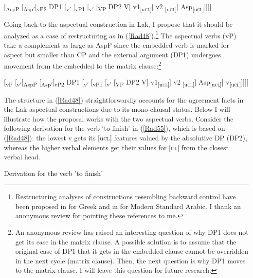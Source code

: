 \documentclass[output=paper]{langscibook}
\begin{document}
\ea\label{Rad54}

[\textsubscript{AspP} [\textsubscript{Asp$'$}[\textsubscript{vP2} DP1 [\textsubscript{v$'$} [\textsubscript{vP1} [\textsubscript{v$'$} [\textsubscript{VP} DP2 V]  v1\textsubscript{[u\textsc{cl}]}] v2 \textsubscript{[u\textsc{cl}]}] Asp\textsubscript{[u\textsc{cl}]}]]]]\\
\z

Going back to the aspectual construction in Lak, I propose that it should be analyzed as a case of restructuring as in (\ref{Rad48}).\footnote{Restructuring analyses of constructions resembling backward control have been proposed in \cite{Roussou2009} for Greek and in \cite{GreshlerWintner2017} for Modern Standard Arabic. I thank an anonymous review for pointing these references to me.} The aspectual verbs (vP) take a complement as large as AspP since the embedded verb is marked for aspect but smaller than CP and the external argument (DP1) undergoes movement from the embedded to the matrix clause:\footnote{An anonymous review has raised an interesting question of why DP1 does not get its case in the matrix clause. A possible solution is to assume that the original case of DP1 that it gets in the embedded clause cannot be overridden in the next cycle (matrix clause). Then, the next question is why DP1 moves to the matrix clause. I will leave this question for future research.}

\ea\label{Rad48}
[\textsubscript{vP} [\textsubscript{v$'$}[\textsubscript{AspP} [\textsubscript{Asp$'$}[\textsubscript{vP2} DP1 [\textsubscript{v$'$} [\textsubscript{vP1} [\textsubscript{v$'$} [\textsubscript{VP} DP2 V]  v1\textsubscript{[u\textsc{cl}]}] v2 \textsubscript{[u\textsc{cl}]}] Asp\textsubscript{[u\textsc{cl}]}] v\textsubscript{[u\textsc{cl}]}]]]]\\
\z 

The structure in (\ref{Rad48}) straightforwardly accounts for the agreement facts in the Lak aspectual constructions due to its mono-clausal status. Below I will illustrate how the proposal works with the two aspectual verbs. Consider the following derivation for the verb ‘to finish’ in (\ref{Rad55}), which is based on (\ref{Rad48}): the lowest v gets its [u\textsc{cl}] features valued by the absolutive DP (DP2), whereas the higher verbal elements get their values for [\textsc{cl}] from the closest verbal head.

\newpage
\ea\label{Rad55}	
Derivation for the verb 'to finish'
\hspace{-2em}
\z 
\end{document}
